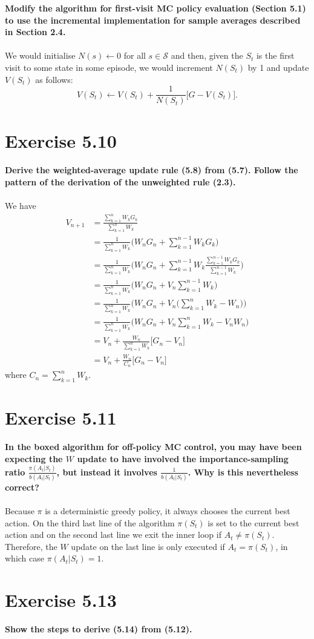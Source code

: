 \documentclass[a4paper,11pt]{article}
\numberwithin{equation}{section}
\theoremstyle{remark}
\begin{document}
\textbf{Modify the algorithm for first-visit MC policy evaluation (Section 5.1) to use the incremental implementation for sample averages described in Section 2.4.}
\\ \\
We would initialise $N(s) \gets 0$ for all $s \in \mathcal{S}$ and then, given the $S_t$ is the first visit to some state in some episode, we would increment $N(S_t)$ by 1 and update $V(S_t)$ as follows:
\[
V(S_t) \gets V(S_t) + \frac{1}{N(S_t)} \Big[G - V(S_t)\Big].
\]

\section{Exercise 5.10}

\textbf{Derive the weighted-average update rule (5.8) from (5.7). Follow the pattern of the derivation of the unweighted rule (2.3).}
\\ \\
We have
\begin{align*}
	V_{n + 1} & = \frac{\sum_{k=1}^{n}W_k G_k}{\sum_{k=1}^{n}W_k} \\
			  & = \frac{1}{\sum_{k=1}^{n}W_k} \Bigg( W_n G_n + \sum_{k=1}^{n-1}W_k G_k \Bigg) \\
			  & = \frac{1}{\sum_{k=1}^{n}W_k} \Bigg( W_n G_n + \sum_{k=1}^{n-1}W_k \frac{\sum_{k=1}^{n-1}W_k G_k}{\sum_{k=1}^{n-1}W_k} \Bigg) \\
			  & = \frac{1}{\sum_{k=1}^{n}W_k} \Bigg( W_n G_n + V_n \sum_{k=1}^{n-1}W_k \Bigg) \\
			  & = \frac{1}{\sum_{k=1}^{n}W_k} \Bigg( W_n G_n + V_n \Bigg( \sum_{k=1}^{n}W_k - W_n \Bigg) \Bigg) \\
			  & = \frac{1}{\sum_{k=1}^{n}W_k} \Bigg( W_n G_n + V_n \sum_{k=1}^{n}W_k - V_n W_n \Bigg) \\
			  & = V_n + \frac{W_n}{\sum_{k=1}^{n}W_k} \Big[G_n - V_n\Big] \\
			  & = V_n + \frac{W_n}{C_n} \Big[G_n - V_n\Big]
\end{align*}
where $C_n = \sum_{k=1}^{n}W_k$.

\section{Exercise 5.11}

\textbf{In the boxed algorithm for off-policy MC control, you may have been expecting the $W$ update to have involved the importance-sampling ratio $\frac{\pi(A_t | S_t)}{b(A_t | S_t)}$, but instead it involves $\frac{1}{b(A_t | S_t)}$. Why is this nevertheless correct?}
\\ \\
Because $\pi$ is a deterministic greedy policy, it always chooses the current best action. On the third last line of the algorithm $\pi(S_t)$ is set to the current best action and on the second last line we exit the inner loop if $A_t \neq \pi(S_t)$. Therefore, the $W$ update on the last line is only executed if $A_t = \pi(S_t)$, in which case $\pi(A_t | S_t) = 1$.


\section{Exercise 5.13}

\textbf{Show the steps to derive (5.14) from (5.12).}
\\ \\
\end{document}
